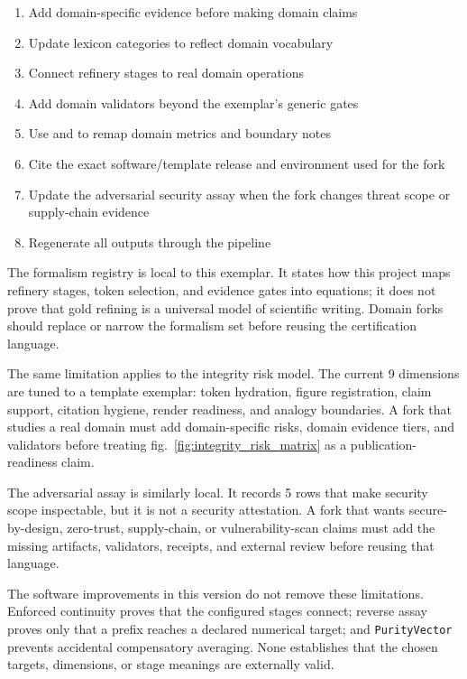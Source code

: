 \documentclass[
  english,
]{article}
\providecommand{\tightlist}{%
  \setlength{\itemsep}{0pt}\setlength{\parskip}{0pt}}
\begin{document}
\begin{enumerate}
\def\labelenumi{\arabic{enumi}.}
\tightlist
\item
  Add domain-specific evidence before making domain claims
\item
  Update lexicon categories to reflect domain vocabulary
\item
  Connect refinery stages to real domain operations
\item
  Add domain validators beyond the exemplar's generic gates
\item
  Use  and
   to remap domain metrics and
  boundary notes
\item
  Cite the exact software/template release and environment used for the
  fork
\item
  Update the adversarial security assay when the fork changes threat
  scope or supply-chain evidence
\item
  Regenerate all outputs through the pipeline
\end{enumerate}

The formalism registry is local to this exemplar. It states how this
project maps refinery stages, token selection, and evidence gates into
equations; it does not prove that gold refining is a universal model of
scientific writing. Domain forks should replace or narrow the formalism
set before reusing the certification language.

The same limitation applies to the integrity risk model. The current 9
dimensions are tuned to a template exemplar: token hydration, figure
registration, claim support, citation hygiene, render readiness, and
analogy boundaries. A fork that studies a real domain must add
domain-specific risks, domain evidence tiers, and validators before
treating fig.~\ref{fig:integrity_risk_matrix} as a publication-readiness
claim.

The adversarial assay is similarly local. It records 5 rows that make
security scope inspectable, but it is not a security attestation. A fork
that wants secure-by-design, zero-trust, supply-chain, or
vulnerability-scan claims must add the missing artifacts, validators,
receipts, and external review before reusing that language.

The software improvements in this version do not remove these
limitations. Enforced continuity proves that the configured stages
connect; reverse assay proves only that a prefix reaches a declared
numerical target; and \texttt{PurityVector} prevents accidental
compensatory averaging. None establishes that the chosen targets,
dimensions, or stage meanings are externally valid.
\end{document}
